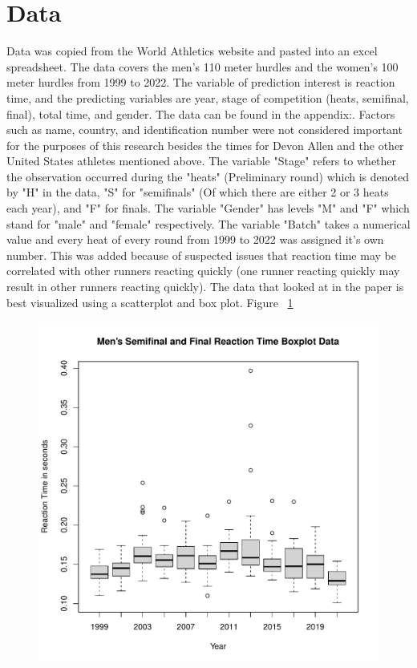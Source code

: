 \documentclass[12pt, letterpaper, titlepage]{article}
\begin{document}
\section{Data}
\label{sec:Data}
Data was copied from the World Athletics website and pasted into an excel
spreadsheet. The data covers the men's 110 meter hurdles and the women's 100
meter hurdles from 1999 to 2022.  The variable of prediction interest is reaction
time, and the predicting variables are year, stage of competition (heats, 
semifinal, final), total time, and gender.  The data can be found in the appendix:.  
Factors such as name, country, and identification number were
not considered important for the purposes of this research besides the times for
Devon Allen and the other United States athletes mentioned above.  The variable "Stage"
refers to whether the observation occurred during the "heats" (Preliminary round) which
is denoted by "H" in the data, "S" for "semifinals" (Of which there are either 2 or 3 heats each year), and "F" for finals. The variable "Gender" has levels "M" and "F" which
stand for "male" and "female" respectively.  The variable "Batch" takes a numerical value and every heat of every round from 1999 to 2022 was assigned it's own number.  This
was added because of suspected issues that reaction time may be correlated with other runners reacting quickly (one runner reacting quickly may result in other runners reacting quickly).  The data that looked at in the paper is best visualized using a scatterplot and box plot. Figure ~\ref{fig:DataBoxPlot}
\begin{figure}[h]
  \centering 
  \includegraphics[scale = 0.8]{DataBoxPlot}
  \label{fig:DataBoxPlot}
\end{figure}
\end{document}
